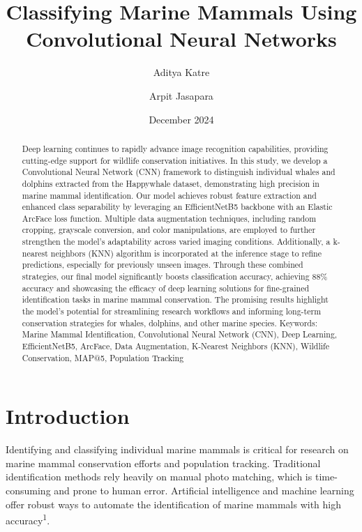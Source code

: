 \documentclass[twocolumn]{article}
\title{Classifying Marine Mammals Using Convolutional Neural Networks}
\author[1]{Aditya Katre}
\author[2]{Arpit Jasapara}
\affil[1]{Del Norte High, San Diego, California}
\affil[2]{University of California Los Angeles, Los Angeles, California}
\begin{document}
\date{December 2024}
\maketitle

\begin{abstract}
Deep learning continues to rapidly advance image recognition capabilities, providing cutting-edge support for wildlife conservation initiatives. In this study, we develop a Convolutional Neural Network (CNN) framework to distinguish individual whales and dolphins extracted from the Happywhale dataset, demonstrating high precision in marine mammal identification. Our model achieves robust feature extraction and enhanced class separability by leveraging an EfficientNetB5 backbone with an Elastic ArcFace loss function. Multiple data augmentation techniques, including random cropping, grayscale conversion, and color manipulations, are employed to further strengthen the model’s adaptability across varied imaging conditions. Additionally, a k-nearest neighbors (KNN) algorithm is incorporated at the inference stage to refine predictions, especially for previously unseen images. Through these combined strategies, our final model significantly boosts classification accuracy, achieving 88\% accuracy and showcasing the efficacy of deep learning solutions for fine-grained identification tasks in marine mammal conservation. The promising results highlight the model’s potential for streamlining research workflows and informing long-term conservation strategies for whales, dolphins, and other marine species.
\newline
\newline
Keywords: Marine Mammal Identification, Convolutional Neural Network (CNN), Deep Learning, EfficientNetB5, ArcFace, Data Augmentation, K-Nearest Neighbors (KNN), Wildlife Conservation, MAP@5, Population Tracking
\end{abstract}

\section{Introduction}
Identifying and classifying individual marine mammals is critical for research on marine mammal conservation efforts and population tracking. Traditional identification methods rely heavily on manual photo matching, which is time-consuming and prone to human error. Artificial intelligence and machine learning offer robust ways to automate the identification of marine mammals with high accuracy\textsuperscript{1}.
\end{document}
